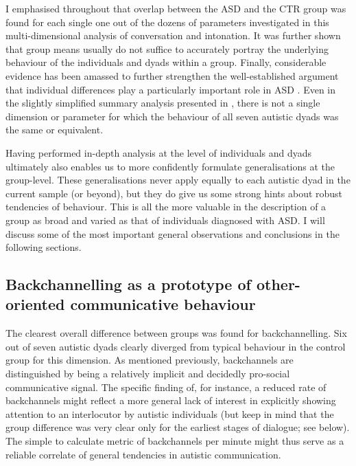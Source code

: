 I emphasised throughout that overlap between the ASD and the CTR group was found for each single one out of the dozens of parameters investigated in this multi-dimensional analysis of conversation and intonation. It was further shown that group means usually do not suffice to accurately portray the underlying behaviour of the individuals and dyads within a group. Finally, considerable evidence has been amassed to further strengthen the well-established argument that individual differences play a particularly important role in ASD \citep[cf.][]{griceLinguisticProsodyAutism2023,goldbergConstructionistApproachOffers2021,wozniakDevelopmentAutismSpectrum2017}. Even in the slightly simplified summary analysis presented in , there is not a single dimension or parameter for which the behaviour of all seven autistic dyads was the same or equivalent.

Having performed in-depth analysis at the level of individuals and dyads ultimately also enables us to more confidently formulate generalisations at the group-level. These generalisations never apply equally to each autistic dyad in the current sample (or beyond), but they do give us some strong hints about robust tendencies of behaviour. This is all the more valuable in the description of a group as broad and varied as that of individuals diagnosed with ASD. I will discuss some of the most important general observations and conclusions in the following sections.

\subsection{Backchannelling as a prototype of other-oriented communicative behaviour}\label{Conclusion_discussion_backchannels}

The clearest overall difference between groups was found for backchannelling. Six out of seven autistic dyads clearly diverged from typical behaviour in the control group for this dimension. As mentioned previously, backchannels are distinguished by being a relatively implicit and decidedly pro-social communicative signal. The specific finding of, for instance, a reduced rate of backchannels might reflect a more general lack of interest in explicitly showing attention to an interlocutor by autistic individuals (but keep in mind that the group difference was very clear only for the earliest stages of dialogue; see  below). The simple to calculate metric of backchannels per minute might thus serve as a reliable correlate of general tendencies in autistic communication.

